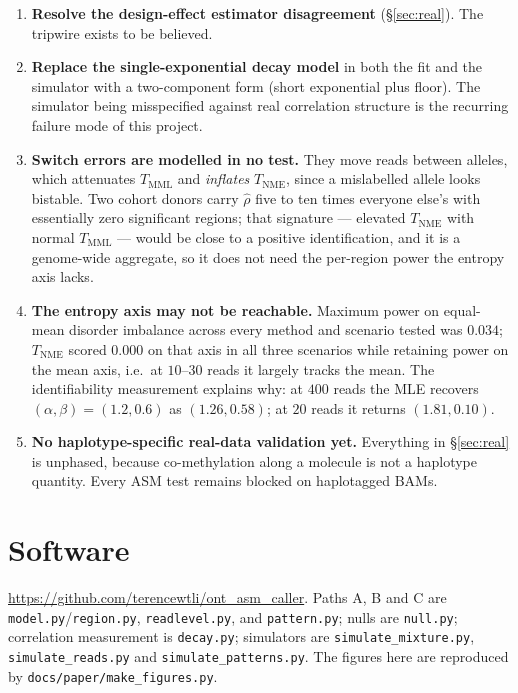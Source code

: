 \documentclass[11pt]{article}
\begin{document}
\begin{enumerate}
\item \textbf{Resolve the design-effect estimator disagreement} (\S\ref{sec:real}).
The tripwire exists to be believed.
\item \textbf{Replace the single-exponential decay model} in both the fit and the
simulator with a two-component form (short exponential plus floor). The simulator
being misspecified against real correlation structure is the recurring failure
mode of this project.
\item \textbf{Switch errors are modelled in no test.} They move reads between
alleles, which attenuates $T_{\mathrm{MML}}$ and \emph{inflates}
$T_{\mathrm{NME}}$, since a mislabelled allele looks bistable. Two cohort donors
carry $\hat\rho$ five to ten times everyone else's with essentially zero
significant regions; that signature --- elevated $T_{\mathrm{NME}}$ with normal
$T_{\mathrm{MML}}$ --- would be close to a positive identification, and it is a
genome-wide aggregate, so it does not need the per-region power the entropy axis
lacks.
\item \textbf{The entropy axis may not be reachable.} Maximum power on equal-mean
disorder imbalance across every method and scenario tested was $0.034$;
$T_{\mathrm{NME}}$ scored $0.000$ on that axis in all three scenarios while
retaining power on the mean axis, i.e.\ at $10$--$30$ reads it largely tracks the
mean. The identifiability measurement explains why: at $400$ reads the MLE
recovers $(\alpha, \beta) = (1.2, 0.6)$ as $(1.26, 0.58)$; at $20$ reads it
returns $(1.81, 0.10)$.
\item \textbf{No haplotype-specific real-data validation yet.} Everything in
\S\ref{sec:real} is unphased, because co-methylation along a molecule is not a
haplotype quantity. Every ASM test remains blocked on haplotagged BAMs.
\end{enumerate}

\section*{Software}

\url{https://github.com/terencewtli/ont_asm_caller}. Paths A, B and C are
\texttt{model.py}/\texttt{region.py}, \texttt{readlevel.py}, and
\texttt{pattern.py}; nulls are \texttt{null.py}; correlation measurement is
\texttt{decay.py}; simulators are \texttt{simulate\_mixture.py},
\texttt{simulate\_reads.py} and \texttt{simulate\_patterns.py}. The figures here
are reproduced by \texttt{docs/paper/make\_figures.py}.
\end{document}
